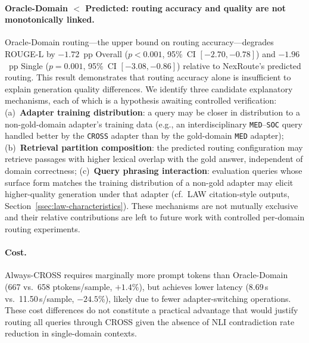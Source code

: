 \documentclass[a4paper,fleql,doubleblind]{cas-sc}
\begin{document}
\paragraph{Oracle-Domain $<$ Predicted: routing accuracy and quality are not monotonically linked.}
Oracle-Domain routing---the upper bound on routing accuracy---degrades ROUGE-L
by $-1.72$~pp Overall ($p{<}0.001$, 95\%~CI $[-2.70,{-}0.78]$) and $-1.96$~pp
Single ($p{=}0.001$, 95\%~CI $[-3.08,{-}0.86]$) relative to NexRoute's predicted routing.
This result demonstrates that routing accuracy alone is insufficient to explain
generation quality differences.
We identify three candidate explanatory mechanisms, each of which is a hypothesis
awaiting controlled verification:
(a)~\textbf{Adapter training distribution}: a query may be closer in distribution
to a non-gold-domain adapter's training data (e.g., an interdisciplinary
\texttt{MED}--\texttt{SOC} query handled better by the \texttt{CROSS} adapter
than by the gold-domain \texttt{MED} adapter);
(b)~\textbf{Retrieval partition composition}: the predicted routing configuration
may retrieve passages with higher lexical overlap with the gold answer, independent
of domain correctness;
(c)~\textbf{Query phrasing interaction}: evaluation queries whose surface form
matches the training distribution of a non-gold adapter may elicit higher-quality
generation under that adapter (cf.\ LAW citation-style outputs, Section~\ref{ssec:law-characteristics}).
These mechanisms are not mutually exclusive and their relative contributions are
left to future work with controlled per-domain routing experiments.

\paragraph{Cost.}
Always-CROSS requires marginally more prompt tokens than Oracle-Domain
(667 vs.\ 658 ptokens/sample, $+1.4$\%), but achieves lower latency
(8.69\,s vs.\ 11.50\,s/sample, $-24.5$\%), likely due to fewer adapter-switching
operations.
These cost differences do not constitute a practical advantage that would justify
routing all queries through CROSS given the absence of NLI contradiction rate reduction
in single-domain contexts.
\end{document}
